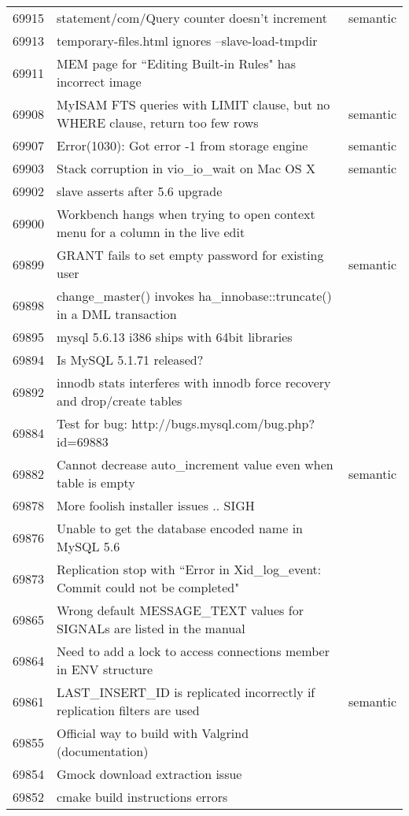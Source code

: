 \begin{longtable}[c]{p{1cm}p{10cm}p{1cm}}
69915 & statement/com/Query counter doesn't increment & semantic \\
69913 & temporary-files.html ignores --slave-load-tmpdir &  \\
69911 & MEM page for ``Editing Built-in Rules" has incorrect image &  \\
69908 & MyISAM FTS queries with LIMIT clause, but no WHERE clause, return too few rows & semantic \\
69907 & Error(1030): Got error -1 from storage engine & semantic \\
69903 & Stack corruption in vio\_io\_wait on Mac OS X & semantic \\
69902 & slave asserts after 5.6 upgrade &  \\
69900 & Workbench hangs when trying to open context menu for a column in the live edit &  \\
69899 & GRANT fails to set empty password for existing user & semantic \\
69898 & change\_master() invokes ha\_innobase::truncate() in a DML transaction &  \\
69895 & mysql 5.6.13 i386 ships with 64bit libraries &  \\
69894 & Is MySQL 5.1.71 released? &  \\
69892 & innodb stats interferes with innodb force recovery and drop/create tables &  \\
69884 & Test for bug: http://bugs.mysql.com/bug.php?id=69883 &  \\
69882 & Cannot decrease auto\_increment value even when table is empty & semantic \\
69878 & More foolish installer issues .. SIGH &  \\
69876 & Unable to get the database encoded name in MySQL 5.6 &  \\
69873 & Replication stop with ``Error in Xid\_log\_event: Commit could not be completed" &  \\
69865 & Wrong default MESSAGE\_TEXT values for SIGNALs are listed in the manual &  \\
69864 & Need to add a lock to access connections member in ENV structure &  \\
69861 & LAST\_INSERT\_ID is replicated incorrectly if replication filters are used & semantic \\
69855 & Official way to build with Valgrind (documentation) &  \\
69854 & Gmock download extraction issue &  \\
69852 & cmake build instructions errors &  \\

\end{longtable}
